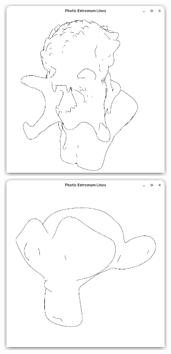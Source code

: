 \documentclass[9pt,fleqn,twoside,twocolumn]{stdglobal}
\begin{document}
\begin{figure}
\begin{subfigure}[t]{0.19\textwidth}
        \includegraphics[width=0.95\textwidth,trim={15px 15 15 50},clip]{images/results/predator-contours.png}
        \includegraphics[width=0.95\textwidth,trim={15px 15 15 50},clip]{images/results/suzanne-contours.png}

\end{subfigure}
\end{figure}
\end{document}
